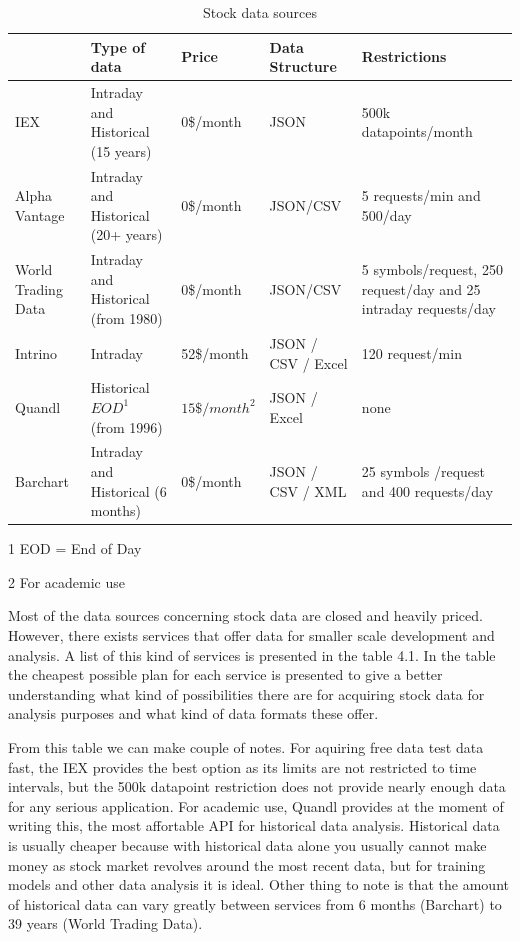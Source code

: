 \begin{table}[! htbp]\centering 
    \caption{Stock data sources}
    \begin{threeparttable}
        \begin{tabular}{|p{2cm}|p{2.5cm}|l|p{2cm}|p{3cm}|} 
        \hline
        & Type of data & Price & Data Structure & Restrictions \\ \hline
        IEX \cite{iex}& Intraday and Historical (15 years) & 0\$/month & JSON & 500k datapoints/month \\ \hline
        Alpha Vantage \cite{alphavantage}  & Intraday and Historical (20+ years)& 0\$/month & JSON/CSV & 5 requests/min and 500/day\\ \hline
        World Trading Data \cite{worldtradingdata} & Intraday and Historical (from 1980) & 0\$/month & JSON/CSV & 5 symbols/request, 250 request/day and 25 intraday requests/day\\ \hline
        Intrino \cite{intrino} & Intraday & 52\$/month & JSON / CSV / Excel & 120 request/min\\ \hline
        Quandl \cite{quandl} & Historical $EOD^1$ (from 1996) & $15\$/month^2$ & JSON / Excel & none\\ \hline
        Barchart \cite{barchart} & Intraday and Historical (6 months) & 0\$/month & JSON / CSV / XML & 25 symbols /request and 400 requests/day\\
        \hline
        \end{tabular}
        \begin{tablenotes}\footnotesize
            \item[1] EOD = End of Day
            \item[2] For academic use 
        \end{tablenotes}
    \end{threeparttable}        
\end{table}

Most of the data sources concerning stock data are closed and heavily priced.
However, there exists services that offer data for smaller scale development and analysis.
A list of this kind of services is presented in the table 4.1.
In the table the cheapest possible plan for each service is presented to give a better understanding what kind of possibilities there are for acquiring stock data for analysis purposes and what kind of data formats these offer.

From this table we can make couple of notes.
For aquiring free data test data fast, the IEX provides the best option as its limits are not restricted to time intervals, but the 500k datapoint restriction does not provide nearly enough data for any serious application.
For academic use, Quandl provides at the moment of writing this, the most affortable API for historical data analysis.
Historical data is usually cheaper because with historical data alone you usually cannot make money as stock market revolves around the most recent data, but for training models and other data analysis it is ideal.
Other thing to note is that the amount of historical data can vary greatly between services from 6 months (Barchart) to 39 years (World Trading Data).

